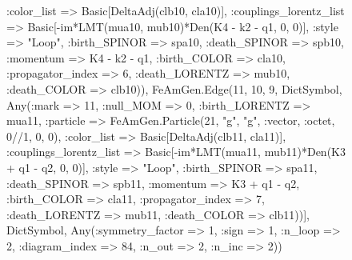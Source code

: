 \documentclass{revtex4}
\begin{document}
\begin{figure}[!htb]
\begin{center}
{:color_list => Basic[DeltaAdj(clb10, cla10)], :couplings_lorentz_list => Basic[-im*LMT(mua10, mub10)*Den(K4 - k2 - q1, 0, 0)], :style => "Loop", :birth_SPINOR => spa10, :death_SPINOR => spb10, :momentum => K4 - k2 - q1, :birth_COLOR => cla10, :propagator_index => 6, :death_LORENTZ => mub10, :death_COLOR => clb10)), FeAmGen.Edge(11, 10, 9, Dict{Symbol, Any}(:mark => 11, :null_MOM => 0, :birth_LORENTZ => mua11, :particle => FeAmGen.Particle(21, "g", "g", :vector, :octet, 0//1, 0, 0), :color_list => Basic[DeltaAdj(clb11, cla11)], :couplings_lorentz_list => Basic[-im*LMT(mua11, mub11)*Den(K3 + q1 - q2, 0, 0)], :style => "Loop", :birth_SPINOR => spa11, :death_SPINOR => spb11, :momentum => K3 + q1 - q2, :birth_COLOR => cla11, :propagator_index => 7, :death_LORENTZ => mub11, :death_COLOR => clb11))], Dict{Symbol, Any}(:symmetry_factor => 1, :sign => 1, :n_loop => 2, :diagram_index => 84, :n_out => 2, :n_inc => 2)) 
}
\end{center}
\end{figure}
\end{document}
